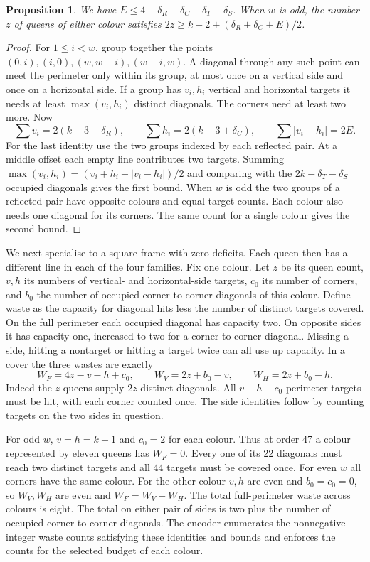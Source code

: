 \documentclass[11pt]{article}
\newtheorem{proposition}[theorem]{Proposition}
\begin{document}
\begin{proposition}\label{prop:profile}
We have $E\le4-\delta_R-\delta_C-\delta_T-\delta_S$. When $w$ is odd,
the number $z$ of queens of either colour satisfies
$2z\ge k-2+(\delta_R+\delta_C+E)/2$.
\end{proposition}
\begin{proof}
For $1\le i<w$, group together the points
$(0,i),(i,0),(w,w-i),(w-i,w)$. A diagonal through any such point can
meet the perimeter only within its group, at most once on a vertical
side and once on a horizontal side. If a group has $v_i,h_i$ vertical
and horizontal targets it needs at least $\max(v_i,h_i)$ distinct
diagonals. The corners need at least two more. Now
\[
 \sum v_i=2(k-3+\delta_R),\qquad
 \sum h_i=2(k-3+\delta_C),\qquad \sum |v_i-h_i|=2E .
\]
For the last identity use the two groups indexed by each reflected pair.
At a middle offset each empty line contributes two targets. Summing
$\max(v_i,h_i)=(v_i+h_i+|v_i-h_i|)/2$ and comparing with the
$2k-\delta_T-\delta_S$ occupied diagonals gives the first bound. When
$w$ is odd the two groups of a reflected pair have opposite colours
and equal target counts. Each colour also needs one diagonal for its
corners. The same count for a single colour gives the second bound.
\end{proof}

We next specialise to a square frame with zero deficits. Each queen then
has a different line in each of the four families. Fix one colour. Let
$z$ be its queen count, $v,h$ its numbers of vertical- and horizontal-side
targets, $c_0$ its number of corners, and $b_0$ the number of occupied
corner-to-corner diagonals of this colour. Define waste as the capacity
for diagonal hits less the number of distinct targets covered. On the full
perimeter each occupied diagonal has capacity two. On opposite sides it
has capacity one, increased to two for a corner-to-corner diagonal.
Missing a side, hitting a nontarget or hitting a target twice can all
use up capacity. In a cover the three wastes are exactly
\[
 W_F=4z-v-h+c_0,\qquad W_V=2z+b_0-v,\qquad W_H=2z+b_0-h .
\]
Indeed the $z$ queens supply $2z$ distinct diagonals. All $v+h-c_0$
perimeter targets must be hit, with each corner counted once. The
side identities follow by counting targets on the two sides in question.

For odd $w$, $v=h=k-1$ and $c_0=2$ for each colour. Thus at order 47 a
colour represented by eleven queens has $W_F=0$. Every one of its 22
diagonals must reach two distinct targets and all 44 targets must be
covered once. For even $w$ all corners have the same colour. For the
other colour $v,h$ are even and $b_0=c_0=0$, so $W_V,W_H$ are even and
$W_F=W_V+W_H$. The total full-perimeter waste across colours is eight.
The total on either pair of sides is two plus the number of occupied
corner-to-corner diagonals. The encoder enumerates the nonnegative integer waste counts satisfying
these identities and bounds and enforces the counts for the selected
budget of each colour.
\end{document}
